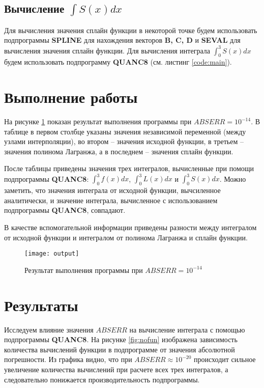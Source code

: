 \subsection{Вычисление $\int S(x)dx$}

Для вычисления значения сплайн функции в некоторой точке будем использовать подпрограммы \textbf{SPLINE} для нахождения векторов \textbf{B, C, D} и \textbf{SEVAL} для вычисления значения сплайн функции. Для вычисления интеграла $\int_0^3 S(x)dx$ будем использовать подпрограмму \textbf{QUANC8} (см. листинг \ref{code:main}).

\section{Выполнение работы}

На рисунке \ref{fig:res} показан результат выполнения программы при $ABSERR = 10^{-14}$. В таблице в первом столбце указаны значения независимой переменной (между узлами интерполяции), во втором -- значения исходной функции, в третьем -- значения полинома Лагранжа, а в последнем -- значения сплайн функции.

После таблицы приведены значения трех интегралов, вычисленные при помощи подпрограммы \textbf{QUANC8}: $\int_0^3 f(x)dx$, $\int_0^3 L(x)dx$ и $\int_0^3 S(x)dx$. Можно заметить, что значения интеграла от исходной функции, вычсиленное аналитически, и значение интеграла, вычисленное с использованием подпрограммы \textbf{QUANC8}, совпадают.

В качестве вспомогательной информации приведены разности между интегралом от исходной функции и интегралом от полинома Лагранжа и сплайн функции.

\begin{figure}[H]
\begin{center}
	\texttt{[image: output]}
	\caption{Результат выполнения программы при $ABSERR = 10^{-14}$}
	\label{fig:res}
\end{center}
\end{figure}

\vspace{-1cm}

\section{Результаты}

Исследуем влияние значения $ABSERR$ на вычисление интеграла с помощью подпрограммы \textbf{QUANC8}. На рисунке \ref{fig:nofun} изображена зависимость количества вычислений функции в подпрограмме от значения абсолютной погрешности. Из графика видно, что при $ABSERR \approx 10^{-20}$ происходит сильное увеличение количества вычислений при расчете всех трех интегралов, а следовательно понижается производительность подпрограммы.

